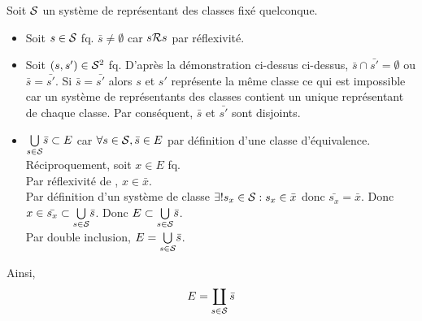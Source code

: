\documentclass{article}
\renewenvironment{question_kholle}[2][ ]
{
	\subsection{\texorpdfstring{#2}{}}
	\notblank{#1}
	{
		\noindent #1
		\bigbreak
	}
	{}
	\begin{proof}
}
{
	\end{proof}
}
\begin{document}
\begin{question_kholle}
		Soit $\mathcal S$ un système de représentant des classes fixé quelconque.
		
		\begin{itemize}[label=\textemdash]
			\item Soit $s\in \mathcal S$ fq. $\bar{s} \neq \emptyset$ car $s \mathcal R s$ par réflexivité.
			\item Soit $(s, s') \in \mathcal S^2$ fq. D'après la démonstration ci-dessus ci-dessus, $\bar{s} \cap \bar{s'} = \emptyset$ ou $\bar{s} = \bar{s'}$. Si $\bar{s} = \bar{s'}$ alors $s$ et $s'$ représente la même classe ce qui est impossible car un système de représentants des classes contient un unique représentant de chaque classe. Par conséquent, $\bar{s}$ et $\bar{s'}$ sont disjoints.
			\item $\underset{s \in \mathcal S}{\bigcup} \bar{s} \subset E$ car $\forall s \in \mathcal S, \bar{s} \in E$ par définition d'une classe d'équivalence. \\
			Réciproquement, soit $x \in E$ fq. \\
			Par réflexivité de \Rel, $x \in \bar{x}$. \\
			Par définition d'un système de classe $\exists ! s_x \in \mathcal S : s_x \in \bar{x}$ donc $\bar{s_x} = \bar{x}$. Donc $x \in \bar{s_x} \subset \underset{s \in \mathcal S}{\bigcup} \bar{s}$. Donc $E \subset \underset{s \in \mathcal S}{\bigcup} \bar{s}$. \\
			Par double inclusion, $E = \underset{s \in \mathcal S}{\bigcup} \bar{s}$.			
		\end{itemize}
		
		Ainsi,
		\begin{equation}
			E = \coprod_{s \in \mathcal S} \bar{s}
		\end{equation}
		
	\end{question_kholle}
\end{document}
